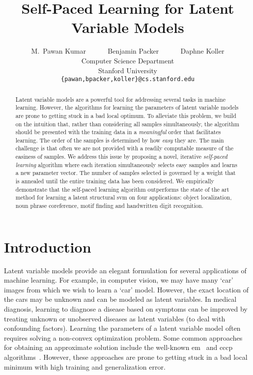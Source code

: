 \documentclass{article}
\title{Self-Paced Learning for Latent Variable Models}
\author{
M.\ Pawan Kumar ~~~~~ Benjamin Packer ~~~~~ Daphne Koller\\
Computer Science Department \\
Stanford University \\
\texttt{\{pawan,bpacker,koller\}@cs.stanford.edu}
}
\newcommand{\mysection}[1]{\vspace{-4mm}\section{#1}\vspace{-4mm}}
\begin{document}
 

\maketitle
\vspace{-8mm}

\begin{abstract}
\vspace{-4mm}
Latent variable models are a powerful tool for addressing several tasks
in machine learning. However, the algorithms for learning the parameters
of latent variable models are prone to getting stuck in a bad local optimum.
To alleviate this problem, we build on the intuition
that, rather than considering all samples simultaneously, the algorithm should be presented with the
training data in a {\em meaningful} order that facilitates learning. 
The order of the samples is determined by how {\em easy} they are. The main challenge
is that often we are not provided with
a readily computable measure of the easiness of samples. We address this issue by 
proposing a novel, iterative {\em self-paced learning} algorithm where each iteration
simultaneously selects easy samples and learns a new parameter vector.
The number of samples selected is governed by
a weight that is annealed until the entire training data has been considered.
We empirically demonstrate that the
self-paced learning algorithm outperforms the state of the art method for
learning a latent structural {\sc svm} on
four applications: object localization, noun phrase coreference, motif finding and handwritten digit recognition.
\end{abstract}
\vspace{-4mm}

\mysection{Introduction}
\label{sec:introduction}

Latent variable models provide an elegant formulation for several applications
of machine learning. For example, in
computer vision, we may have many `car' images from which
we wish to learn a `car' model. However, the exact location
of the cars may be unknown and can be modeled as latent
variables. In medical diagnosis, learning to diagnose a
disease based on symptoms can be improved by treating unknown or
unobserved diseases as latent variables (to deal with confounding
factors). Learning the parameters of a latent variable model often
requires solving a non-convex optimization problem. Some common approaches
for obtaining an approximate solution include the well-known {\sc em}~\cite{dempsterjrss77}
and {\sc cccp} algorithms~\cite{felzenszwalbcvpr08,yuicml09,yuillenc03}.
However, these approaches are prone to getting stuck in a bad local minimum with
high training and generalization error.
\end{document}
